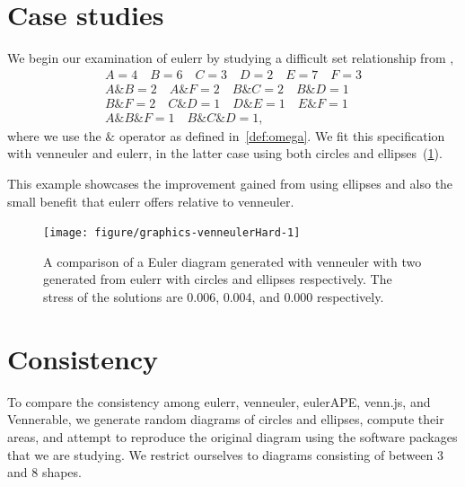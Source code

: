 \documentclass[
  oneside,
  openany,
  numbers=noendperiod,
  parskip=half,
  bibliography=totoc
]{scrbook}\usepackage[]{graphicx}\usepackage{xcolor}
\newenvironment{knitrout}{}{} %
\newcommand{\pkg}[1]{{\fontseries{b}\selectfont #1}}
\begin{document}
\section{Case studies}
\label{sec:caseStudies}

We begin our examination of \pkg{eulerr} by studying a difficult set
relationship from \citet{wilkinson_2012},
\begin{gather*}
A = 4 \quad B = 6 \quad C = 3 \quad D = 2 \quad E = 7 \quad F = 3\\
A\& B = 2 \quad A\&F = 2 \quad B\& C = 2 \quad B\&D = 1 \\
B\& F = 2 \quad C\&D = 1 \quad D\& E = 1 \quad E\&F = 1 \\
A\&B\&F = 1 \quad B\&C\&D = 1,\end{gather*}
where we use the $\&$ operator as defined in~\cref{def:omega}. We fit this
specification with \pkg{venneuler} and \pkg{eulerr}, in the latter case using
both circles and ellipses~(\cref{fig:venneulerHard}).

This example showcases the improvement gained from using ellipses and also the
small benefit that \pkg{eulerr} offers relative to \pkg{venneuler}.

\begin{figure}[thb]
\begin{knitrout}\small
{}\color{fgcolor}

{\centering \texttt{[image: figure/graphics-venneulerHard-1]} 

}



\end{knitrout}
\caption{A comparison of a Euler diagram generated with \pkg{venneuler} with two
generated from \pkg{eulerr} with circles and ellipses respectively. The stress
of the solutions are 0.006, 0.004, and 0.000 respectively.}
\label{fig:venneulerHard}
\end{figure}

\section{Consistency}
\label{sec:consistency}

To compare the consistency among \pkg{eulerr}, \pkg{venneuler}, \pkg{eulerAPE},
\pkg{venn.js}, and \pkg{Vennerable}, we generate random diagrams of circles and
ellipses, compute their areas, and attempt to reproduce the original diagram
using the software packages that we are studying. We restrict ourselves to
diagrams consisting of between 3 and 8 shapes.
\end{document}
